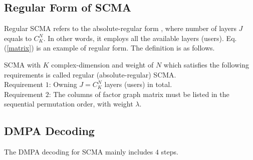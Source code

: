 \documentclass[journal,twoside]{IEEEtran}
\begin{document}
\subsection{Regular Form of SCMA}
Regular SCMA refers to the absolute-regular form \cite{ryan2002low,gallager1962low}, where number of layers $J$ equals to $C^{N}_{K}$. In other words, it employs all the available layers (users). Eq. (\ref{matrix}) is an example of regular form. The definition is as follows.
\begin{myDef}
SCMA with $K$ complex-dimension and weight of $N$ which satisfies the following requirements is called regular (absolute-regular) SCMA.\\
Requirement $1$: Owning $J = C^{N}_{K}$ layers (users) in total.\\
Requirement $2$: The columns of factor graph matrix must be listed in the sequential permutation order, with weight $\lambda$.
\end{myDef}
%
\subsection{DMPA Decoding}
The DMPA decoding for SCMA mainly includes $4$ steps.
\end{document}
